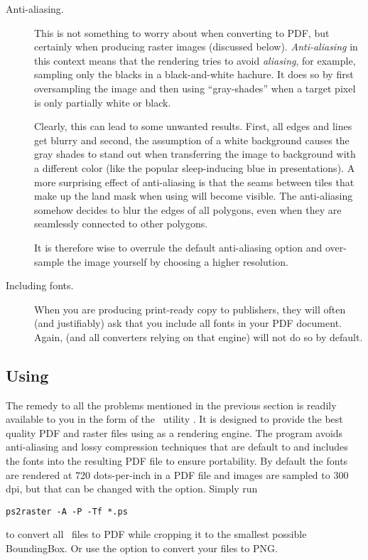 \begin{description}
\item[Anti-aliasing.] This is not something to worry about when converting to PDF, but certainly when producing raster images (discussed below). \emph{Anti-aliasing} in this context means that the rendering tries to avoid \emph{aliasing}, for example, sampling only the blacks in a black-and-white hachure. It does so by first oversampling the image and then using ``gray-shades'' when a target pixel is only partially white or black.

Clearly, this can lead to some unwanted results. First, all edges and lines get blurry and second, the assumption of a white background causes the gray shades to stand out when transferring the image to background with a different color (like the popular sleep-inducing blue in  presentations). A more surprising effect of anti-aliasing is that the seams between tiles that make up the land mask when using  will become visible. The anti-aliasing somehow decides to blur the edges of all polygons, even when they are seamlessly connected to other polygons.

It is therefore wise to overrule the default anti-aliasing option and over-sample the image yourself by choosing a higher resolution.

\item[Including fonts.] When you are producing print-ready copy to publishers, they will often (and justifiably) ask that you include all fonts in your PDF document. Again,  (and all converters relying on that engine) will not do so by default.
\end{description}

\subsection{Using }

The remedy to all the problems mentioned in the previous section is readily available to you in the form of the \GMT\ utility . It is designed to provide the best quality PDF and raster files using  as a rendering engine. The program  avoids anti-aliasing and lossy compression techniques that are default to  and includes the fonts into the resulting PDF file to ensure portability. By default the fonts are rendered at 720 dots-per-inch in a PDF file and images are sampled to 300 dpi, but that can be changed with the  option. Simply run
\small
\begin{verbatim}
ps2raster -A -P -Tf *.ps
\end{verbatim}
\normalsize
to convert all \PS\ files to PDF while cropping it to the smallest possible BoundingBox. Or use the  option to convert your files to PNG.

